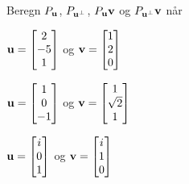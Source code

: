 \begin{oppgave}
Beregn $P_{\V u}$, $P_{\V u^{\perp}}$, $P_{\V u}\V v$ og $P_{\V u^{\perp}}\V v$ når \\[2pt]
\begin{punkt}
$\V{u}=\vvv{2}{-5}{1}$ og $\V{v}=\vvv{1}{2}{0}$\\[4pt]
\end{punkt}

\begin{punkt}
$\V{u}=\vvv{1}{0}{-1}$ og $\V{v}=\vvv{1}{\sqrt{2}}{1}$\\[4pt]
\end{punkt}

\begin{punkt}
$\V{u}=\vvv{i}{0}{1}$ og $\V{v}=\vvv{i}{1}{0}$\\[4pt]
\end{punkt}

\end{oppgave}


